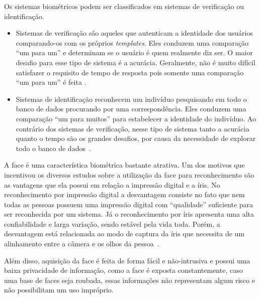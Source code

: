 	Os sistemas biométricos podem ser classificados em sistemas de verificação ou
	identificação. 
	
	\begin{itemize}
		\item Sistemas de verificação são aqueles que autenticam a identidade
		dos usuários comparando-os com os próprios \textit{templates}. Eles conduzem uma
		comparação ``um para um'' e determinam se o usuário é quem realmente diz ser. O
		maior desafio para esse tipo de sistema é a acurácia. Geralmente, não é muito
		difícil satisfazer o requisito de tempo de resposta pois somente uma comparação
		``um para um'' é feita \cite{hong}.
	
		\item Sistemas de identificação reconhecem um indivíduo pesquisando em todo o
		banco de dados procurando por uma correspondência. Eles conduzem uma comparação ``um para
		muitos'' para estabelecer a identidade do indivíduo. Ao contrário dos sistemas
		de verificação, nesse tipo de sistema tanto a acurácia quanto o tempo são os
		grandes desafios, por causa da necessidade de explorar todo o banco de dados~\cite{hong}.
	\end{itemize}
	
	A face é uma característica biométrica bastante atrativa. Um dos motivos que
	incentivou os diversos estudos sobre a utilização da face para reconhecimento
	são as vantagens que ela possui em relação a impressão digital e a íris.  No
	reconhecimento por impressão digital a desvantagem consiste no fato que nem
	todas as pessoas possuem uma impressão digital com ``qualidade'' suficiente para
	ser reconhecida por um sistema. Já o reconhecimento por íris apresenta uma alta
	confiabilidade e larga variação, sendo estável pela vida toda. Porém, a
	desvantagem está relacionada ao modo de captura da íris que necessita de um
	alinhamento entre a câmera e os olhos da pessoa~\cite{saocarlos}.
	
	Além disso, aquisição da face é feita de forma fácil e não-intrusiva e possui
	uma baixa privacidade de informação, como a face é exposta constantemente, caso
	uma base de faces seja roubada, essas informações não representam algum risco e
	não possibilitam um uso impróprio.